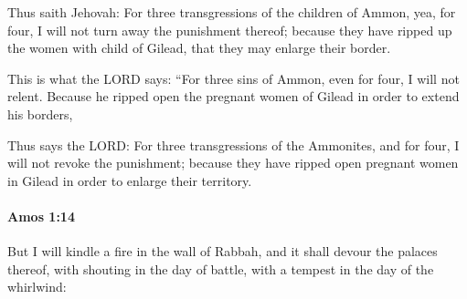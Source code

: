 			\begin{versebox}
					\item[BHS] 
					\item[LXX] 
					\item[ASV] Thus saith Jehovah: For three transgressions of the children of Ammon, yea, for four, I will not turn away the punishment thereof; because they have ripped up the women with child of Gilead, that they may enlarge their border.
					\item[NIV] This is what the LORD says: “For three sins of Ammon, even for four, I will not relent. Because he ripped open the pregnant women of Gilead in order to extend his borders,
					\item[NRSV] Thus says the LORD: For three transgressions of the Ammonites, and for four, I will not revoke the punishment; because they have ripped open pregnant women in Gilead in order to enlarge their territory.
			\end{versebox}

		\paragraph{Amos 1:14} %
			\label{AMOS-1-14}

			But I will kindle a fire in the wall of Rabbah, and it shall devour the palaces thereof, with shouting in the day of battle, with a tempest in the day of the whirlwind:

